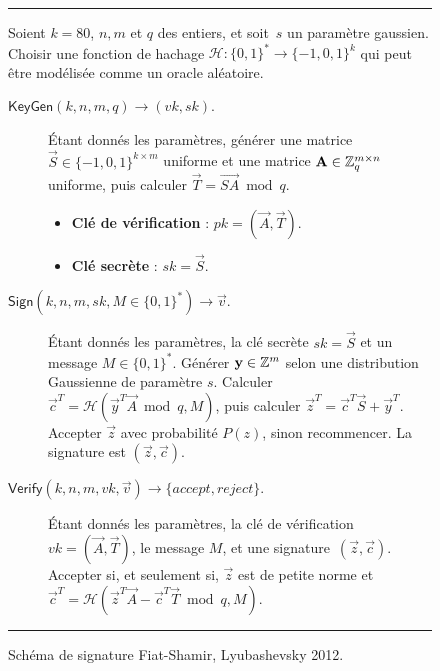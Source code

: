 \begin{figure}[!h]
\rule{\linewidth}{.5pt}
Soient $k=80$, $n, m$ et $q$ des entiers, et soit~$s$ un paramètre gaussien. Choisir une fonction de hachage $\mathcal{H} : \{0, 1\}^* \rightarrow \{ -1,0, 1\}^k$ qui peut être modélisée comme un oracle aléatoire.
\vspace*{-0.2cm}
\begin{description}
\item[$\mathsf{KeyGen}(k,n,m,q) \rightarrow (vk,sk)$.] \'Etant donnés les paramètres,
générer une matrice $\vec{S} \in \{-1,0,1 \}^{k \times m}$ uniforme et une matrice $\mathbf{A} \in \mathbb{Z}_q^{m \times n}$ uniforme, puis calculer $\vec{T}=\vec{SA} \bmod q$. 
\begin{itemize}
\item \textbf{Clé de vérification} : $pk = (\vec{A}, \vec{T})$.
\item \textbf{Clé secrète} : $sk = \vec{S}$.
\end{itemize}

\item[$\mathsf{Sign}(k,n,m,sk,M \in \{0,1\}^{*}) \rightarrow \vec{v} $.] \'Etant donnés les paramètres, la clé secrète $sk = \vec{S}$ et un message $M \in \{ 0,1 \}^*$. Générer $\mathbf{y} \in \mathbb{Z}^m$ selon une distribution Gaussienne de paramètre $s$.
Calculer $\vec{c}^T = \mathcal{H}( \vec{y}^T \vec{A} \bmod q, M)$, puis calculer $\vec{z}^T = \vec{c}^T \vec{S} + \vec{y}^T$. Accepter $\vec{z}$ avec probabilité $P(z)$, sinon recommencer. La signature est $(\vec{z},\vec{c})$.

\item[$\mathsf{Verify}(k,n,m,vk,\vec{v})\rightarrow \{ accept ,reject \}$.] \'Etant donnés les paramètres, la clé de vérification $vk = (\vec{A}, \vec{T})$, le message $M$, et une signature~$(\vec{z},\vec{c})$. Accepter si, et seulement si,
 $\vec{z}$ est de petite norme et  $\vec{c}^T = \mathcal{H}( \vec{z}^T \vec{A} - \vec{c}^T \vec{T} \bmod q, M)$.
\end{description}
\vspace*{-0.5cm}
\rule{\linewidth}{.1pt} %
\caption{Schéma de signature Fiat-Shamir, Lyubashevsky 2012.}
    \label{fig:FSSign}
\end{figure}



